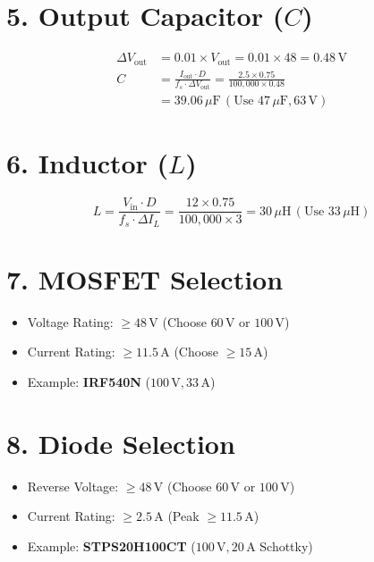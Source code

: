 \documentclass[12pt]{article}
\begin{document}
\section*{5. Output Capacitor (\( C \))}
\begin{align*}
\Delta V_{\text{out}} &= 0.01 \times V_{\text{out}} = 0.01 \times 48 = \boxed{0.48 \, \text{V}} \\
C &= \frac{I_{\text{out}} \cdot D}{f_s \cdot \Delta V_{\text{out}}} = \frac{2.5 \times 0.75}{100,\!000 \times 0.48} \\
&= \boxed{39.06 \, \mu\text{F} \, (\text{Use } 47 \, \mu\text{F}, 63 \, \text{V})}
\end{align*}

\section*{6. Inductor (\( L \))}
\[
L = \frac{V_{\text{in}} \cdot D}{f_s \cdot \Delta I_L} = \frac{12 \times 0.75}{100,\!000 \times 3} = \boxed{30 \, \mu\text{H} \, (\text{Use } 33 \, \mu\text{H})}
\]

\section*{7. MOSFET Selection}
\begin{itemize}[label=$\bullet$]
    \item Voltage Rating: \( \geq 48 \, \text{V} \) (Choose \( 60 \, \text{V} \) or \( 100 \, \text{V} \))
    \item Current Rating: \( \geq 11.5 \, \text{A} \) (Choose \( \geq 15 \, \text{A} \))
    \item Example: \textbf{IRF540N} (\( 100 \, \text{V}, 33 \, \text{A} \))
\end{itemize}

\section*{8. Diode Selection}
\begin{itemize}[label=$\bullet$]
    \item Reverse Voltage: \( \geq 48 \, \text{V} \) (Choose \( 60 \, \text{V} \) or \( 100 \, \text{V} \))
    \item Current Rating: \( \geq 2.5 \, \text{A} \) (Peak \( \geq 11.5 \, \text{A} \))
    \item Example: \textbf{STPS20H100CT} (\( 100 \, \text{V}, 20 \, \text{A} \) Schottky)
\end{itemize}
\end{document}
